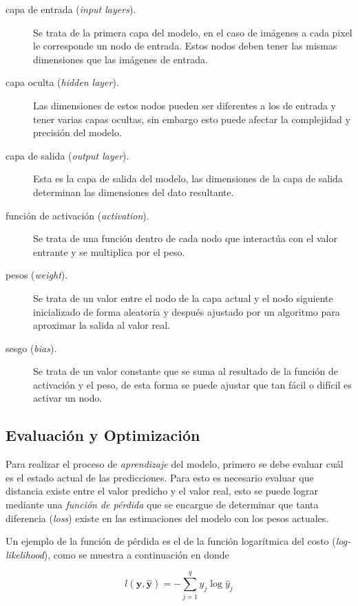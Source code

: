 \begin{description}
    \item[capa de entrada (\emph{input layers}).] { Se trata de la primera capa del modelo, en el caso de imágenes a cada pixel le corresponde un nodo de entrada. Estos nodos deben tener las mismas dimensiones que las imágenes de entrada.}
    \item[capa oculta (\emph{hidden layer}).] {Las dimensiones de estos nodos pueden ser diferentes a los de entrada y tener varias capas ocultas, sin embargo esto puede afectar la complejidad y precisión del modelo.} 
    \item[capa de salida (\emph{output layer}).]  {Esta es la capa de salida del modelo, las dimensiones de la capa de salida determinan las dimensiones del dato resultante.}
    \item[función de activación (\emph{activation}).]{Se trata de una función dentro de cada nodo que interactúa con el valor entrante y se multiplica por el peso.}
    \item[pesos (\emph{weight}).] {Se trata de un valor entre el nodo de la capa actual y el nodo siguiente inicializado de forma aleatoria y después ajustado por un algoritmo para aproximar la salida al valor real.}  
    \item[sesgo (\emph{bias}).] {Se trata de un valor constante que se suma al resultado de la función de activación y el peso, de esta forma se puede ajustar que tan fácil o difícil es activar un nodo.} 
\end{description}

\subsection{Evaluación y Optimización}
Para realizar el proceso de \emph{aprendizaje} del modelo, primero se debe evaluar cuál es el estado actual de las predicciones. Para esto es necesario evaluar que distancia existe entre el valor predicho y el valor real, esto se puede lograr mediante una \emph{función de pérdida} que se encargue de determinar que tanta diferencia (\emph{loss}) existe en las estimaciones del modelo con los pesos actuales.

Un ejemplo de la función de pérdida es el de la función logarítmica del costo (\emph{log-likelihood}), como se muestra a continuación en donde

\begin{equation}
    l(\mathbf{y}, \hat{\mathbf{y}}) = - \sum_{j=1}^q y_j \log \hat{y}_j     
\end{equation}


